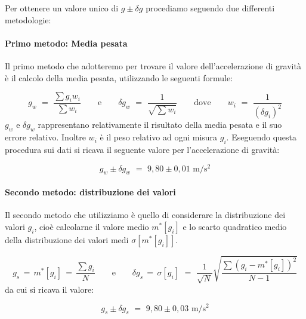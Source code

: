 Per ottenere un valore unico di $g \pm \delta g$ procediamo seguendo due differenti metodologie:

\paragraph{Primo metodo: Media pesata\\}

Il primo metodo che adotteremo per trovare il valore dell'accelerazione di gravità è il calcolo della media pesata, utilizzando le seguenti formule:

\begin{equation*}
g_w \,\, = \,\, \frac{\sum g_iw_i}{\sum w_i} \quad\quad \text{e} \quad\quad \delta g_w \,\, = \,\, \frac{1}{\sqrt{\sum w_i}} \quad\quad \text{dove} \quad\quad w_i \,\, = \,\, \frac{1}{(\delta g_i)^2}
\end{equation*}
%
$g_w$ e $\delta g_w$ rappresentano relativamente il risultato della media pesata e il suo errore relativo. Inoltre $w_i$ è il peso relativo ad ogni misura $g_i$.
Eseguendo questa procedura sui dati si ricava il seguente valore per l'accelerazione di gravità:

\begin{equation}
g_w \pm \delta g_w \,\, = \,\, 9,80 \pm 0,01 \,\, \si{\metre\per\square\second}
\end{equation}

\paragraph{Secondo metodo: distribuzione dei valori\\}

Il secondo metodo che utilizziamo è quello di considerare la distribuzione dei valori $g_i$, cioè calcolarne il valore medio $m^*[g_i]$ e lo scarto quadratico medio della distribuzione dei valori medi $\sigma[m^*[g_i]]$.

\begin{equation*}
g_s \, = \, m^*[g_i] \, = \, \frac{\sum g_i}{N} \quad\quad \text{e} \quad\quad \delta g_s \, = \, \sigma[g_i] \,\, = \,\, \frac{1}{\sqrt{N}}\sqrt{\frac{\sum (g_i - m^*[g_i])^2}{N-1}}
\end{equation*}
%
da cui si ricava il valore:

\begin{equation}
g_s \pm \delta g_s \,\, = \,\, 9,80 \pm 0,03 \,\, \si{\metre\per\square\second}
\end{equation}


